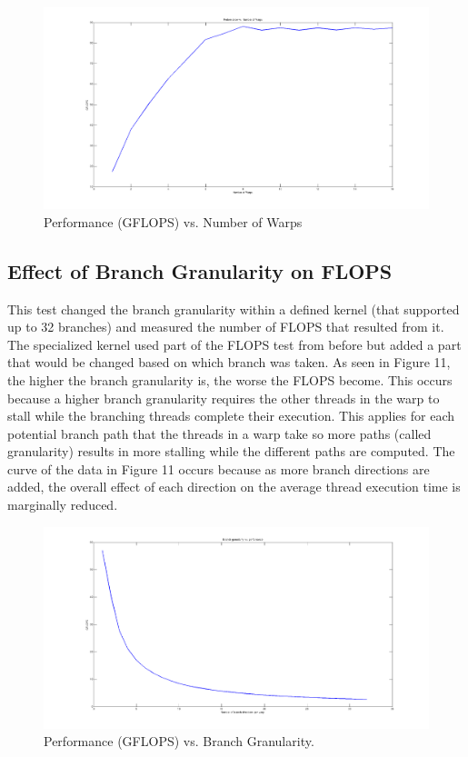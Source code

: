 \documentclass[12pt] {article}
\begin{document}
\begin{figure}[ht!]
	\centering
	\includegraphics[width=5in]{figures/warps_v_perf.png}
	\caption{Performance (GFLOPS) vs. Number of Warps}
\end{figure}
\FloatBarrier

\subsection{Effect of Branch Granularity on FLOPS}
This test changed the branch granularity within a defined kernel (that supported up to 32 branches) and measured the number of FLOPS that resulted from it. The specialized kernel used part of the FLOPS test from before but added a part that would be changed based on which branch was taken. As seen in Figure 11, the higher the branch granularity is, the worse the FLOPS become. This occurs because a higher branch granularity requires the other threads in the warp to stall while the branching threads complete their execution. This applies for each potential branch path that the threads in a warp take so more paths (called granularity) results in more stalling while the different paths are computed. The curve of the data in Figure 11 occurs because as more branch directions are added, the overall effect of each direction on the average thread execution time is marginally reduced.

\begin{figure}[ht!]
	\centering
	\includegraphics[width=5in]{figures/branch_v_perf.png}
	\caption{Performance (GFLOPS) vs. Branch Granularity.}
\end{figure}
\FloatBarrier
\end{document}
